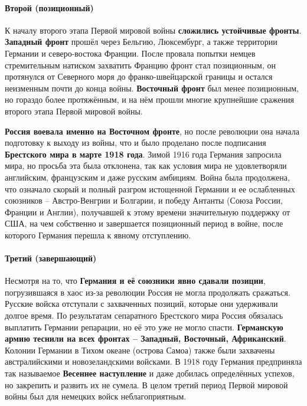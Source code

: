 \documentclass{article}
\begin{document}
\paragraph{Второй (позиционный)}

К началу второго этапа Первой мировой войны \textbf{сложились устойчивые фронты}. \textbf{Западный фронт} прошёл через Бельгию, Люксембург, а также территории Германии и северо-востока Франции. После провала попытки немцев стремительным натиском захватить Францию фронт стал позиционным, он протянулся от Северного моря до франко-швейцарской границы и остался неизменным почти до конца войны. \textbf{Восточный фронт} был менее позиционным, но гораздо более протяжённым, и на нём прошли многие крупнейшие сражения второго этапа Первой мировой войны.

\hfill

\textbf{Россия воевала именно на Восточном фронте}, но после революции она начала подготовку к выходу из войны, что и было проделано после подписания \textbf{Брестского мира в марте 1918 года}. Зимой 1916 года Германия запросила мира, но просьба эта была отклонена, так как условия мира не удовлетворяли английским, французским и даже русским амбициям. Война была продолжена, что означало скорый и полный разгром истощенной Германии и ее ослабленных союзников – Австро-Венгрии и Болгарии, и победу Антанты (Союза России, Франции и Англии), получавшей к этому времени значительную поддержку от США, на чем собственно и завершается позиционный период в войне, после которого Германия перешла к явному отступлению.

\paragraph{Третий (завершающий)}

Несмотря на то, что \textbf{Германия и её союзники явно сдавали позиции}, погрузившаяся в хаос из-за революции Россия не могла продолжать сражаться. Русские войска отступали с захваченных позиций, которые они удерживали долгое время. По результатам сепаратного Брестского мира Россия обязалась выплатить Германии репарации, но её это уже не могло спасти. \textbf{Германскую армию теснили на всех фронтах – Западный, Восточный, Африканский}. Колонии Германии в Тихом океане (острова Самоа) также были захвачены австралийскими и новозеландскими войсками. В 1918 году Германия предприняла так называемое \textbf{Весеннее наступление} и даже добилась определённых успехов, но закрепить и развить их не сумела. В целом третий период Первой мировой войны был для немецких войск неблагоприятным. 
\end{document}
